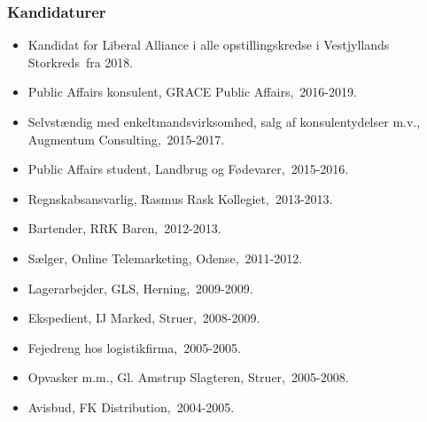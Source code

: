 \documentclass[11pt, a4paper]{awesome-cv}
\begin{document}
\begin{cvletter}
\subsubsection*{Kandidaturer}
\begin{itemize}
\item Kandidat for Liberal Alliance i alle opstillingskredse i Vestjyllands Storkreds fra 2018.
\end{itemize}
\begin{itemize}
\item Public Affairs konsulent, GRACE Public Affairs, 2016-2019.
\item Selvstændig med enkeltmandsvirksomhed, salg af konsulentydelser m.v., Augmentum Consulting, 2015-2017.
\item Public Affairs student, Landbrug og Fødevarer, 2015-2016.
\item Regnskabsansvarlig, Rasmus Rask Kollegiet, 2013-2013.
\item Bartender, RRK Baren, 2012-2013.
\item Sælger, Online Telemarketing, Odense, 2011-2012.
\item Lagerarbejder, GLS, Herning, 2009-2009.
\item Ekspedient, IJ Marked, Struer, 2008-2009.
\item Fejedreng hos logistikfirma, 2005-2005.
\item Opvasker m.m., Gl. Amstrup Slagteren, Struer, 2005-2008.
\item Avisbud, FK Distribution, 2004-2005.
\end{itemize}
\end{cvletter}
\end{document}
